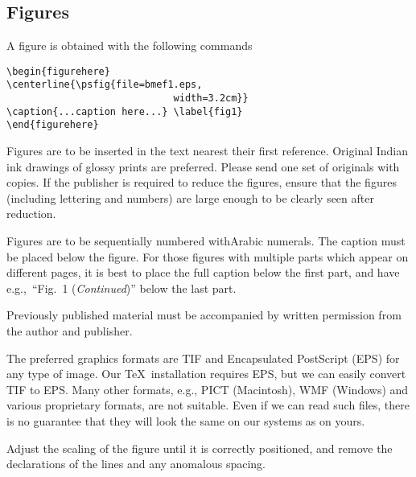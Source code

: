 \documentclass{ws-bme}
\begin{document}
\begin{multicols}{2}
\subsection*{Figures}
A figure is obtained with the following commands

\begin{verbatim}
\begin{figurehere}
\centerline{\psfig{file=bmef1.eps,
                             width=3.2cm}}
\caption{...caption here...} \label{fig1}
\end{figurehere}
\end{verbatim}

\begin{figurehere}
\centerline{}
\caption{ ... caption here ... }
\label{fig1}
\end{figurehere}

Figures are to be inserted in the text nearest their
first reference. Original Indian ink drawings of glossy prints are
preferred. Please send one set of originals with copies. If the
publisher is required to reduce the figures, ensure that the
figures (including lettering and numbers) are large enough to be
clearly seen after reduction.

Figures are to be sequentially numbered with\break Arabic
numerals. The caption must be placed below the figure. For those
figures with multiple parts which appear on different pages, it is
best to place the full caption below the first part, and have
e.g.,~``Fig.~1 ({\it Continued})'' below the last part.

Previously published material must be accompanied by written
permission from the author and publisher.

The preferred graphics formats are TIF and Encapsulated PostScript
(EPS) for any type of image. Our \TeX\ installation requires EPS,
but we can easily convert TIF to EPS. Many other formats, e.g., PICT
(Macintosh), WMF (Windows) and various proprietary formats, are not
suitable. Even if we can read such files, there is no guarantee that
they will look the same on our systems as on yours.

Adjust the scaling of the figure until it is correctly positioned,
and remove the declarations of the lines and any anomalous spacing.


\end{multicols}
\end{document}

